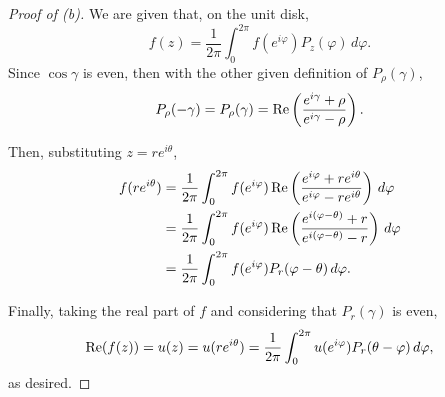 \documentclass[../hw2]{subfiles}
\begin{document}
\begin{proof}[Proof of (b)]
	We are given that, on the unit disk, \[
		f(z)=\frac{1}{2\pi}\int_{0}^{2\pi} f(e^{i\varphi}) P_z(\varphi) \,d\varphi
		.\]
	Since $\cos{\gamma}$ is even, then with the other given definition of $P_{\rho}(\gamma)$,  \[
		P_{\rho}(-\gamma)=P_{\rho}(\gamma)= \operatorname{Re} \left( \frac{ e^{i\gamma} + \rho }{e^{i\gamma} - \rho} \right)
		.\]

	Then, substituting $z=re^{i\theta}$,
	\begin{align*}
		f(re^{i\theta}) & = \frac{1}{2\pi}\int_{0}^{2\pi} f(e^{i\varphi}) \operatorname{Re} \left( \frac{e^{i\varphi} + re^{i\theta}}{e^{i\varphi} - re^{i\theta}} \right) \,d\varphi \\
		                & = \frac{1}{2\pi}\int_{0}^{2\pi} f(e^{i\varphi}) \operatorname{Re} \left( \frac{e^{i(\varphi-\theta)} + r}{e^{i(\varphi-\theta)}-r} \right) \,d\varphi       \\
		                & =  \frac{1}{2\pi}\int_{0}^{2\pi} f(e^{i\varphi}) P_r(\varphi-\theta) \,d\varphi
		.\end{align*}

	Finally, taking the real part of $f$ and considering that $P_r(\gamma)$ is even, \[
		\operatorname{Re}(f(z))=u(z)=u(re^{i\theta})=\frac{1}{2\pi}\int_{0}^{2\pi} u(e^{i\varphi}) P_r(\theta-\varphi)\,d \varphi
		,\] as desired.
\end{proof}
\end{document}
